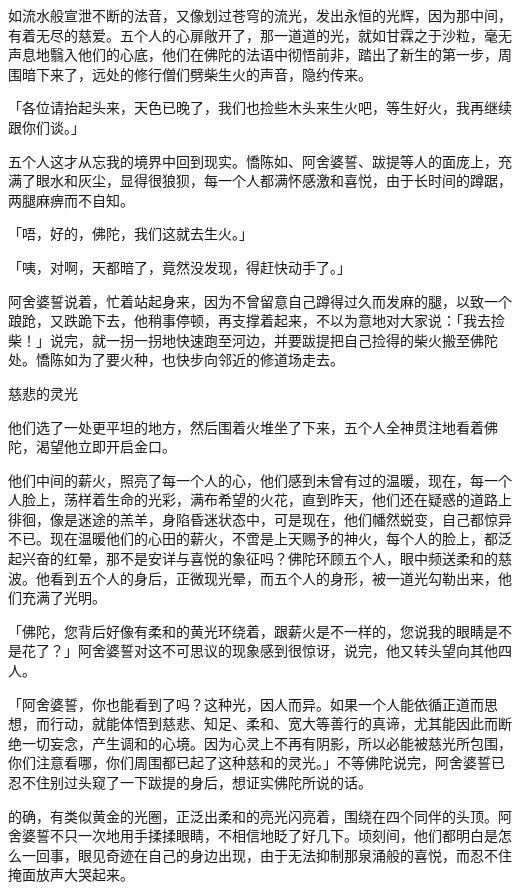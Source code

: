 \documentclass[12pt,twoside,openany]{book}
\begin{document}
如流水般宣泄不断的法音，又像划过苍穹的流光，发出永恒的光辉，因为那中间，有着无尽的慈爱。五个人的心扉敞开了，那一道道的光，就如甘霖之于沙粒，毫无声息地翳入他们的心底，他们在佛陀的法语中彻悟前非，踏出了新生的第一步，周围暗下来了，远处的修行僧们劈柴生火的声音，隐约传来。

「各位请抬起头来，天色已晚了，我们也捡些木头来生火吧，等生好火，我再继续跟你们谈。」

五个人这才从忘我的境界中回到现实。憍陈如、阿舍婆誓、跋提等人的面庞上，充满了眼水和灰尘，显得很狼狈，每一个人都满怀感激和喜悦，由于长时间的蹲踞，两腿麻痹而不自知。

「唔，好的，佛陀，我们这就去生火。」

「咦，对啊，天都暗了，竟然没发现，得赶快动手了。」

阿舍婆誓说着，忙着站起身来，因为不曾留意自己蹲得过久而发麻的腿，以致一个踉跄，又跌跪下去，他稍事停顿，再支撑着起来，不以为意地对大家说：「我去捡柴！」说完，就一拐一拐地快速跑至河边，并要跋提把自己捡得的柴火搬至佛陀处。憍陈如为了要火种，也快步向邻近的修道场走去。

慈悲的灵光

他们选了一处更平坦的地方，然后围着火堆坐了下来，五个人全神贯注地看着佛陀，渴望他立即开启金口。

他们中间的薪火，照亮了每一个人的心，他们感到未曾有过的温暖，现在，每一个人脸上，荡样着生命的光彩，满布希望的火花，直到昨天，他们还在疑惑的道路上徘徊，像是迷途的羔羊，身陷昏迷状态中，可是现在，他们幡然蜕变，自己都惊异不已。现在温暖他们的心田的薪火，不啻是上天赐予的神火，每个人的脸上，都泛起兴奋的红晕，那不是安详与喜悦的象征吗？佛陀环顾五个人，眼中频送柔和的慈波。他看到五个人的身后，正微现光晕，而五个人的身形，被一道光勾勒出来，他们充满了光明。

「佛陀，您背后好像有柔和的黄光环绕着，跟薪火是不一样的，您说我的眼睛是不是花了？」阿舍婆誓对这不可思议的现象感到很惊讶，说完，他又转头望向其他四人。

「阿舍婆誓，你也能看到了吗？这种光，因人而异。如果一个人能依循正道而思想，而行动，就能体悟到慈悲、知足、柔和、宽大等善行的真谛，尤其能因此而断绝一切妄念，产生调和的心境。因为心灵上不再有阴影，所以必能被慈光所包围，你们注意看哪，你们周围都已起了这种慈和的灵光。」不等佛陀说完，阿舍婆誓已忍不住别过头窥了一下跋提的身后，想证实佛陀所说的话。

的确，有类似黄金的光圈，正泛出柔和的亮光闪亮着，围绕在四个同伴的头顶。阿舍婆誓不只一次地用手揉揉眼睛，不相信地眨了好几下。顷刻间，他们都明白是怎么一回事，眼见奇迹在自己的身边出现，由于无法抑制那泉涌般的喜悦，而忍不住掩面放声大哭起来。
\end{document}
